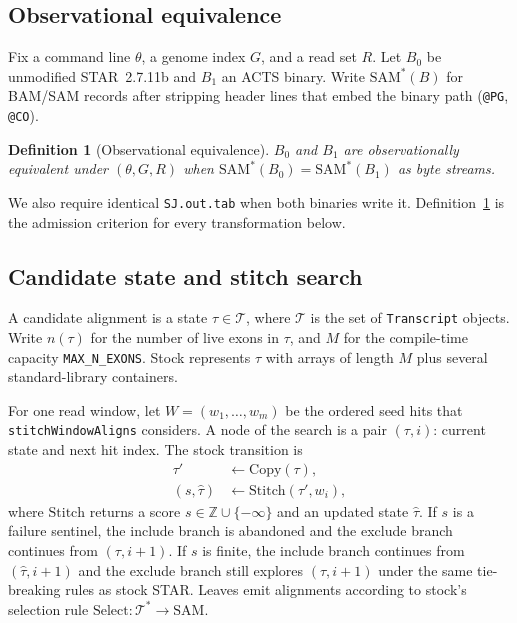 \documentclass[11pt]{article}
\newtheorem{definition}{Definition}
\newcommand{\STAR}{STAR\xspace}
\newcommand{\ACTS}{ACTS\xspace}
\newcommand{\Transcript}{\texttt{Transcript}\xspace}
\newcommand{\swa}{\texttt{stitchWindowAligns}\xspace}
\begin{document}
\subsection{Observational equivalence}
\label{sec:obs}

Fix a command line $\theta$, a genome index $G$, and a read set $R$.
Let $B_0$ be unmodified \STAR~2.7.11b and $B_1$ an \ACTS binary.
Write $\mathrm{SAM}^*(B)$ for BAM/SAM records after stripping header lines that
embed the binary path (\texttt{@PG}, \texttt{@CO}).

\begin{definition}[Observational equivalence]
\label{def:obs}
$B_0$ and $B_1$ are observationally equivalent under $(\theta,G,R)$ when
$\mathrm{SAM}^*(B_0)=\mathrm{SAM}^*(B_1)$ as byte streams.
\end{definition}

We also require identical \texttt{SJ.out.tab} when both binaries write it.
Definition~\ref{def:obs} is the admission criterion for every transformation
below.

\subsection{Candidate state and stitch search}
\label{sec:search}

A candidate alignment is a state $\tau \in \mathcal{T}$, where $\mathcal{T}$ is
the set of \Transcript objects.
Write $n(\tau)$ for the number of live exons in $\tau$, and $M$ for the
compile-time capacity \texttt{MAX\_N\_EXONS}.
Stock represents $\tau$ with arrays of length $M$ plus several
standard-library containers.

For one read window, let $W=(w_1,\ldots,w_m)$ be the ordered seed hits that
\swa considers.
A node of the search is a pair $(\tau,i)$: current state and next hit index.
The stock transition is
\begin{align}
\label{eq:stock-step}
\tau' &\leftarrow \mathrm{Copy}(\tau), \\
(s,\hat\tau) &\leftarrow \mathrm{Stitch}(\tau',w_i),
\end{align}
where $\mathrm{Stitch}$ returns a score $s\in\mathbb{Z}\cup\{-\infty\}$ and an
updated state $\hat\tau$.
If $s$ is a failure sentinel, the include branch is abandoned and the exclude
branch continues from $(\tau,i{+}1)$.
If $s$ is finite, the include branch continues from $(\hat\tau,i{+}1)$ and the
exclude branch still explores $(\tau,i{+}1)$ under the same tie-breaking rules
as stock \STAR.
Leaves emit alignments according to stock's selection rule
$\mathrm{Select}:\mathcal{T}^*\to\mathrm{SAM}$.
\end{document}

